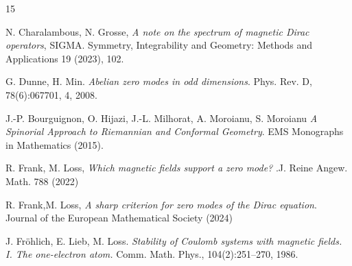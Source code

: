 \documentclass[11pt]{amsart}
\theoremstyle{plain}
\numberwithin{equation}{section}
\theoremstyle{plain}
\begin{document}
 
\begin{thebibliography}{15}








 N. Charalambous, N. Grosse, {\it A note on the spectrum of magnetic Dirac operators}, SIGMA. Symmetry,
Integrability and Geometry: Methods and Applications 19 (2023), 102.


G. Dunne, H. Min. {\it Abelian zero modes in odd dimensions}. Phys. Rev. D, 78(6):067701, 4, 2008.


J.-P. Bourguignon, O. Hijazi, J.-L. Milhorat, A. Moroianu, S. Moroianu {\it A Spinorial Approach to Riemannian and Conformal Geometry}. EMS Monographs in Mathematics (2015).

 R. Frank, M. Loss, {\it  Which magnetic fields support a zero mode?  }.J. Reine Angew. Math. 788 (2022)

 R. Frank,M. Loss, {\it A sharp criterion for zero modes of the Dirac equation}. Journal of the European Mathematical Society (2024)

J. Fröhlich, E. Lieb, M. Loss. {\it Stability of Coulomb systems with magnetic fields. I.
The one-electron atom.} Comm. Math. Phys., 104(2):251–270, 1986.




\end{thebibliography}
\end{document}

